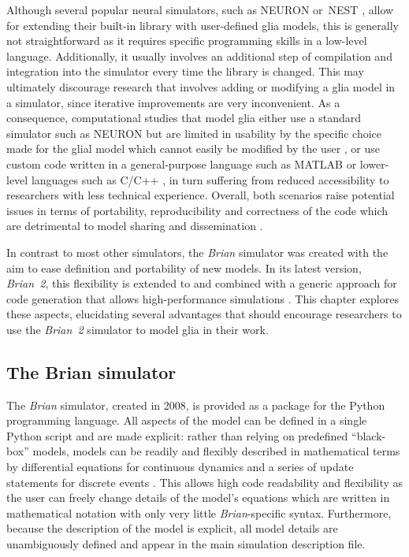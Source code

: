 \documentclass[a4paper, 11pt]{article}
\newcommand{\brian}{\emph{Brian~2}\xspace}
\begin{document}
Although several popular neural simulators, such as NEURON \citep{Carnevale2006} or~NEST \citep{Gewaltig2007}, allow for extending their built-in library with user-defined glia models, this is generally not straightforward as it requires specific programming skills in a low-level language.
Additionally, it usually involves an additional step of compilation and integration into the simulator every time the library is changed.
This may ultimately discourage research that involves adding or modifying a glia model in a simulator, since iterative improvements are very inconvenient.
As a consequence, computational studies that model glia either use a standard simulator such as NEURON but are limited in usability by the specific choice made for the glial model which cannot easily be modified by the user \citep{Aleksin_PCB2017}, or use custom code written in a general-purpose language such as MATLAB \citep{Wade_PLoSOne2011,DePitta_PCB11,Naeem_TNNLS2015} or lower-level languages such as C/C++ \citep{Volman_NC2007,NadkarniLevine2008}, in turn suffering from reduced accessibility to researchers with less technical experience.
Overall, both scenarios raise potential issues in terms of portability, reproducibility and correctness of the code which are detrimental to model sharing and dissemination \citep{Cannon2007}.

In contrast to most other simulators, the \emph{Brian} simulator \citep{Goodman2008,Goodman2009} was created with the aim to ease definition and portability of new models. In its latest version, \brian, this flexibility is extended to and combined with a generic approach for code generation that allows high-performance simulations \citep{Goodman2010, Stimberg2014}. This chapter explores these aspects, elucidating several advantages that should encourage researchers to use the \brian simulator to model glia in their work.

\subsection{The Brian simulator}
The \emph{Brian} simulator, created in 2008, is provided as a package for the Python programming language.
All aspects of the model can be defined in a single Python script and are made explicit: rather than relying on predefined ``black-box'' models, models can be readily and flexibly described in mathematical terms by differential equations for continuous dynamics and a series of update statements for discrete events \citep{Brette2012,Stimberg2014}.
This allows high code readability and flexibility as the user can freely change details of the model's equations which are written in mathematical notation with only very little \emph{Brian}-specific syntax.
Furthermore, because the description of the model is explicit, all model details are unambiguously defined and appear in the main simulation description file.
\end{document}

